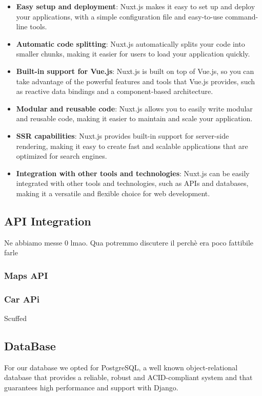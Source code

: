 \documentclass[table, 12pt]{article}
\begin{document}
\begin{itemize}
\item \textbf{Easy setup and deployment}: Nuxt.js makes it easy to set up and deploy your applications, with a simple configuration file and easy-to-use command-line tools.

\item \textbf{Automatic code splitting}: Nuxt.js automatically splits your code into smaller chunks, making it easier for users to load your application quickly.

\item \textbf{Built-in support for Vue.js}: Nuxt.js is built on top of Vue.js, so you can take advantage of the powerful features and tools that Vue.js provides, such as reactive data bindings and a component-based architecture.

\item \textbf{Modular and reusable code}: Nuxt.js allows you to easily write modular and reusable code, making it easier to maintain and scale your application.

\item \textbf{SSR capabilities}: Nuxt.js provides built-in support for server-side rendering, making it easy to create fast and scalable applications that are optimized for search engines.

\item \textbf{Integration with other tools and technologies}: Nuxt.js can be easily integrated with other tools and technologies, such as APIs and databases, making it a versatile and flexible choice for web development.
\end{itemize} 

\subsection{API Integration}
Ne abbiamo messe 0 lmao. Qua potremmo discutere il perchè era poco fattibile farle 
\subsubsection{Maps API}
\subsubsection{Car APi}
Scuffed

\subsection{DataBase}
For our database we opted for PostgreSQL, a well known object-relational
database that provides a reliable, robust and ACID-compliant system and that guarantees high performance and support with Django.
\end{document}
